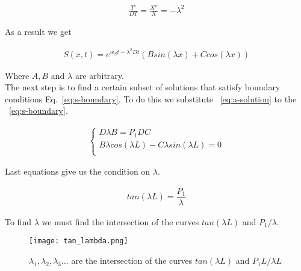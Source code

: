 \documentclass[10pt, oneside]{article}
\begin{document}
\begin{linenomath}
	\begin{align} 
	\frac{T'}{DT}=\frac{X''}{X}=-\lambda^2
	\end{align}
\end{linenomath}

As a result we get
\begin{linenomath}
	\begin{align} 
	\label{eq:a-solution}
	S(x,t)=e^{w_St-\lambda^2Dt}\left(Bsin(\lambda x)+Ccos(\lambda x )\right)
	\end{align}
\end{linenomath}
Where $A,B$ and $ \lambda$ are arbitrary.\\

The next step is to find a certain subset of solutions that satisfy boundary conditions Eq.~\eqref{eq:s-boundary}. To do this we substitute ~\eqref{eq:a-solution} to the ~\eqref{eq:s-boundary}.

\begin{linenomath}
	\begin{align} 
	\begin{cases}
	D\lambda B=P_1DC \\
	B\lambda cos(\lambda L)-C \lambda sin(\lambda L)=0 \\
	\end{cases}
	\end{align}
\end{linenomath}

Last equations give us the condition on $\lambda$.
\begin{linenomath}
	\begin{align} 
    tan(\lambda L)=\dfrac{P_1}{\lambda}
	\end{align}
\end{linenomath}

To find $\lambda$ we must find the intersection of the curves $tan(\lambda L)$ and $P_1/\lambda$.
\begin{figure}[h!]
	\texttt{[image: tan\_lambda.png]}
	\caption{$\lambda_1, \lambda_2, \lambda_3 ...$ are the intersection of the curves $tan(\lambda L)$ and $P_1 L/\lambda L$}
\end{figure}
\end{document}
